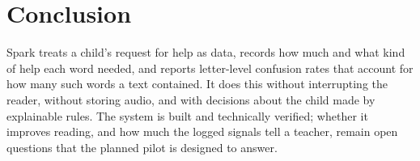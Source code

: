 \documentclass[manuscript, screen, review, anonymous]{acmart}
\begin{document}
\section{Conclusion}
Spark treats a child's request for help as data, records how much and what kind of help each word needed, and reports letter-level confusion rates that account for how many such words a text contained. It does this without interrupting the reader, without storing audio, and with decisions about the child made by explainable rules. The system is built and technically verified; whether it improves reading, and how much the logged signals tell a teacher, remain open questions that the planned pilot is designed to answer.



\end{document}
